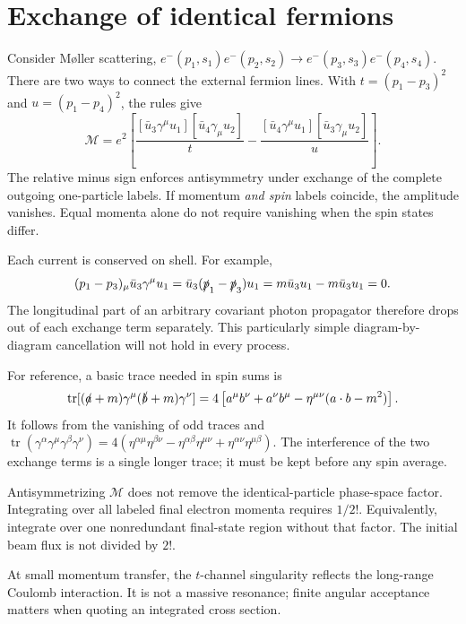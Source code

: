 \documentclass[11pt]{article}
\newcommand{\tr}{\operatorname{tr}}
\newcommand{\module}[1]{\clearpage\section{#1}}
\newcommand{\cM}{\mathcal M}
\begin{document}
\module{Exchange of identical fermions}
Consider M\o ller scattering,
\(e^-(p_1,s_1)e^-(p_2,s_2)\to e^-(p_3,s_3)e^-(p_4,s_4)\).
There are two ways to connect the external fermion lines. With
\(t=(p_1-p_3)^2\) and \(u=(p_1-p_4)^2\), the rules give
\begin{equation}
 \cM=e^2\left[
 \frac{[\bar u_3\gamma^\mu u_1][\bar u_4\gamma_\mu u_2]}{t}
 -\frac{[\bar u_4\gamma^\mu u_1][\bar u_3\gamma_\mu u_2]}{u}
 \right].
 \label{eq:moller}
\end{equation}
The relative minus sign enforces antisymmetry under exchange of the
complete outgoing one-particle labels. If momentum \emph{and spin} labels
coincide, the amplitude vanishes. Equal momenta alone do not require
vanishing when the spin states differ.

Each current is conserved on shell. For example,
\begin{equation}
 (p_1-p_3)_\mu\bar u_3\gamma^\mu u_1
 =\bar u_3(\slashed p_1-\slashed p_3)u_1
 =m\bar u_3u_1-m\bar u_3u_1=0.
\end{equation}
The longitudinal part of an arbitrary covariant photon propagator
therefore drops out of each exchange term separately. This particularly
simple diagram-by-diagram cancellation will not hold in every process.

For reference, a basic trace needed in spin sums is
\begin{equation}
 \tr[(\slashed a+m)\gamma^\mu(\slashed b+m)\gamma^\nu]
 =4\left[a^\mu b^\nu+a^\nu b^\mu
 -\eta^{\mu\nu}(a\cdot b-m^2)\right].
\end{equation}
It follows from the vanishing of odd traces and
\(\tr(\gamma^\alpha\gamma^\mu\gamma^\beta\gamma^\nu)
=4(\eta^{\alpha\mu}\eta^{\beta\nu}-\eta^{\alpha\beta}\eta^{\mu\nu}
+\eta^{\alpha\nu}\eta^{\mu\beta})\).
The interference of the two exchange terms is a single longer trace;
it must be kept before any spin average.

\begin{remarkbox}
Antisymmetrizing \(\cM\) does not remove the identical-particle phase-space
factor. Integrating over all labeled final electron momenta requires
\(1/2!\). Equivalently, integrate over one nonredundant final-state region
without that factor. The initial beam flux is not divided by \(2!\).
\end{remarkbox}
At small momentum transfer, the \(t\)-channel singularity reflects the
long-range Coulomb interaction. It is not a massive resonance; finite
angular acceptance matters when quoting an integrated cross section.
\end{document}
